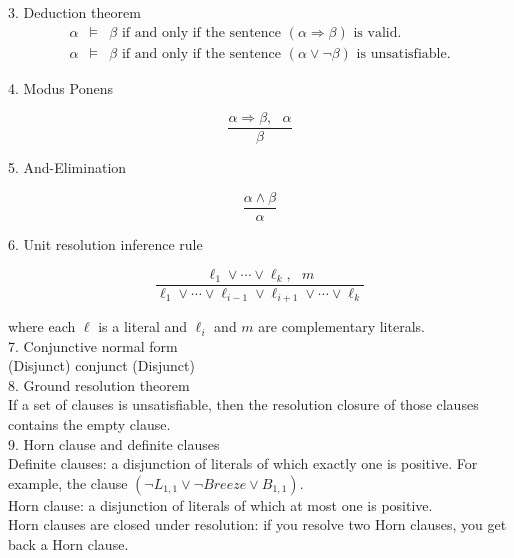 \documentclass[12pt]{article}
\begin{document}
3. Deduction theorem
\begin{eqnarray*}
  \alpha &\models& \beta \text{ if and only if the sentence } (\alpha \Rightarrow \beta) \text{ is valid.} \\
  \alpha &\models& \beta \text{ if and only if the sentence } (\alpha \lor \lnot \beta) \text{ is unsatisfiable.}
\end{eqnarray*}

4. Modus Ponens

\begin{equation*}
  \frac {\alpha \Rightarrow \beta, \text{   } \alpha}{\beta}
\end{equation*}

5. And-Elimination

\begin{equation*}
  \frac {\alpha \land \beta}{\alpha} 
\end{equation*}

6. Unit resolution inference rule

\begin{equation*}
  \frac {\ell_1 \lor \cdots \lor \ell_k, \text{   } m}
        {\ell_1 \lor \cdots \lor \ell_{i-1} \lor \ell_{i+1} \lor \cdots \lor \ell_k}
\end{equation*}

where each $\ell$ is a literal and $\ell_i$ and $m$ are complementary literals. \\

7. Conjunctive normal form \\

(Disjunct) conjunct (Disjunct) \\

8. Ground resolution theorem \\

If a set of clauses is unsatisfiable, then the resolution closure of those clauses contains the empty clause. \\

9. Horn clause and definite clauses \\

Definite clauses: a disjunction of literals of which exactly one is positive. For example, the clause $(\lnot L_{1,1} \lor \lnot Breeze \lor B_{1,1})$. \\

Horn clause: a disjunction of literals of which at most one is positive. \\

Horn clauses are closed under resolution: if you resolve two Horn clauses, you get back a Horn clause.
\end{document}
